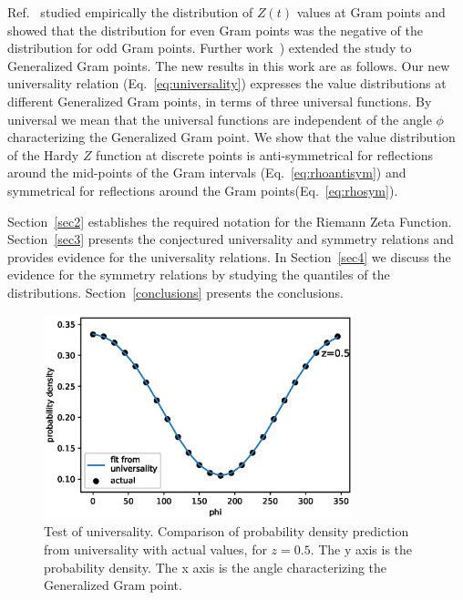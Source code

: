 \documentclass[twoside]{article}
\begin{document}
Ref.~\cite{Shanker 2018a} studied empirically the distribution of $Z(t)$ values at 
Gram points and
showed  that the distribution for even Gram points was the negative  of the 
distribution for odd Gram points. 
Further work~\cite{Shanker 2018b}) extended the study to Generalized Gram points. 
The new results in this work are as follows. 
Our new universality relation (Eq.~\ref{eq:universality}) expresses the value distributions 
at different Generalized Gram points, in terms of three universal functions.
By universal we mean that the universal functions are independent of the angle $\phi$
characterizing the  Generalized Gram point.
We show that the  value
distribution of the Hardy $Z$ function at discrete points is anti-symmetrical 
for reflections around the mid-points 
of the Gram intervals (Eq.~\ref{eq:rhoantisym}) and symmetrical for reflections 
around the Gram points(Eq.~\ref{eq:rhosym}). 

Section~\ref{sec2} establishes the required notation for the 
Riemann Zeta Function. 
Section~\ref{sec3} presents the conjectured universality and symmetry relations
and provides evidence for the universality relations.
In Section~\ref{sec4} we discuss the evidence for the symmetry relations
by studying the quantiles of the distributions.
Section~\ref{conclusions} presents the conclusions. 


\begin{figure}
\centering
\includegraphics[width=0.8\textwidth]{z05.eps}
\caption[]{ 
 Test of universality. Comparison of probability density prediction from
 universality with actual values, for $z=0.5$. The y axis is the probability density.
 The x axis is the angle characterizing the Generalized Gram point.
  }
\vspace{1mm}
\label{z05}
\end{figure}
\end{document}
